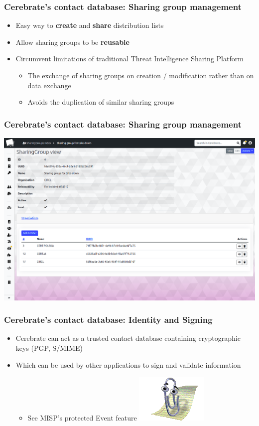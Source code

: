 \begin{frame}
\frametitle{Cerebrate's contact database: Sharing group management}
    \begin{itemize}
        \item Easy way to \textbf{create} and \textbf{share} distribution lists
        \item Allow sharing groups to be \textbf{reusable}
        \item Circumvent limitations of traditional Threat Intelligence Sharing Platform
        \begin{itemize}
            \item The exchange of sharing groups on creation / modification rather than on data exchange
            \item Avoids the duplication of similar sharing groups
        \end{itemize}
    \end{itemize}
\end{frame}

\begin{frame}
\frametitle{Cerebrate's contact database: Sharing group management}
    \begin{center}
        \includegraphics[width=0.9\linewidth]{pictures/sharinggroup.png}
    \end{center}
\end{frame}

\begin{frame}
\frametitle{Cerebrate's contact database: Identity and Signing}
    \begin{itemize}
        \item Cerebrate can act as a trusted contact database containing cryptographic keys (PGP, S/MIME)
        \item Which can be used by other applications to sign and validate information
        \begin{itemize}
            \item See MISP's protected Event feature \includegraphics[width=0.09\linewidth]{pictures/clippy-solo.png}
        \end{itemize}
    \end{itemize}
\end{frame}

